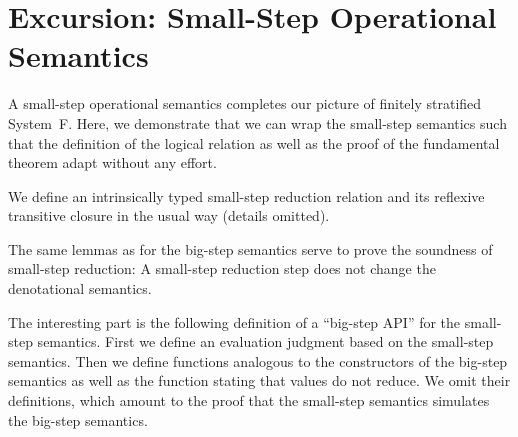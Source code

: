\documentclass[acmsmall,anonymous,review,screen]{acmart}
\begin{document}




\section{Excursion: Small-Step Operational Semantics}
\label{sec:excurs-small-step}

A small-step operational semantics completes our picture of finitely
stratified System~F. Here, we demonstrate that we can wrap the small-step semantics such that the definition of the logical relation as well as the proof of the fundamental theorem adapt without any effort.

We define an intrinsically typed small-step reduction relation and its
reflexive transitive closure in the usual way (details omitted).
\SmallStepSingleReduction
\SmallStepReduction

The same lemmas as for the big-step semantics serve to prove the
soundness of small-step reduction:
A small-step reduction step does not change the denotational semantics.
\SmallStepSoundness

The interesting part is the following definition of a ``big-step API'' for the small-step semantics.
First we define an evaluation judgment based on the small-step semantics.
\SmallStepBigAPI
Then we define functions analogous to the constructors of the big-step semantics as well as the function stating that values do not reduce.
\SmallStepBigAPIFunctions
We omit their definitions, which amount to the proof that the small-step semantics simulates the big-step semantics.
\end{document}
